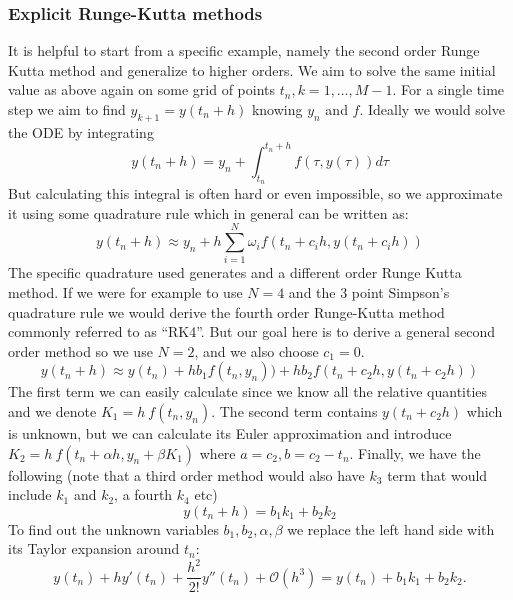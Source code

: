 \documentclass[11pt]{article}
\begin{document}
    \subsubsection{Explicit Runge-Kutta methods}
    It is helpful to start from a specific example, namely the second order Runge Kutta method and generalize to higher
    orders.
    We aim to solve the same initial value as above again on some grid of points ${t_n, k=1, \dots,M-1}$.
    For a single time step we aim to find $y_{k+1} = y(t_n+h)$ knowing $y_n$ and $f$.
    Ideally we would solve the ODE by integrating
    \begin{equation*}
        y(t_n+h) = y_n + \int_{t_n}^{t_n + h} f( \tau, y(\tau) ) d\tau
    \end{equation*}
    But calculating this integral is often hard or even impossible, so we approximate it using some quadrature rule
    which in general can be written as:
    \begin{equation*}
        y(t_n + h) \approx y_n + h\sum_{i=1}^N \omega_i f(t_n + c_i h, y(t_n + c_i h))
    \end{equation*}
    The specific quadrature used generates and a different order Runge Kutta method.
    If we were for example to use $N=4$ and the 3 point Simpson's quadrature rule we would derive the fourth order
    Runge-Kutta method commonly referred to as ``RK4''.
    But our goal here is to derive a general second order method so we use $N=2$, and we also choose $c_1 = 0$.
    \begin{equation*}
        y(t_n+h) \approx y(t_n) + hb_1 f(t_n, y_n)) + hb_2 f(t_n + c_2 h, y(t_n+ c_2 h) )
    \end{equation*}
    The first term we can easily calculate since we know all the relative quantities and we denote
    $K_1 = h\:f(t_n, y_n)$.
    The second term contains $y(t_n + c_2 h)$ which is unknown, but we can calculate its Euler approximation and
    introduce $ K_2 = h\:f(t_n + \alpha h, y_n + \beta K_1) $ where $a=c_2, b = c_2 - t_n$.
    Finally, we have the following (note that a third order method would also have $k_3$ term that would include $k_1$ and $k_2$, a
    fourth $k_4$ etc)
    \begin{equation*}
        y(t_n + h) = b_1 k_1 + b_2 k_2
    \end{equation*}
    To find out the unknown variables $b_1, b_2, \alpha, \beta$ we replace the left hand side with its Taylor expansion
    around $t_n$:
    \begin{equation*}
        y(t_n) + h y'(t_n) + \frac{h^{2}}{2!}y''(t_n) + \mathcal{O}\left(h^{3}\right)
        =
        y(t_n) + b_{1}k_{1} + b_{2}k_{2}.
        \label{eq:sol:tayl1}
    \end{equation*}
\end{document}
